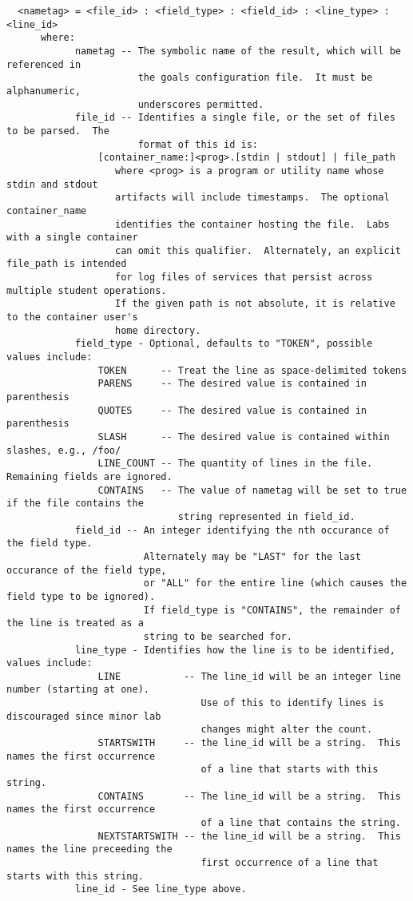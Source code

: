 \documentclass{article}
\begin{document}
\begin{verbatim}
  <nametag> = <file_id> : <field_type> : <field_id> : <line_type> : <line_id>
      where:
            nametag -- The symbolic name of the result, which will be referenced in 
                       the goals configuration file.  It must be alphanumeric, 
                       underscores permitted.
            file_id -- Identifies a single file, or the set of files to be parsed.  The 
                       format of this id is:
                [container_name:]<prog>.[stdin | stdout] | file_path
                   where <prog> is a program or utility name whose stdin and stdout 
                   artifacts will include timestamps.  The optional container_name 
                   identifies the container hosting the file.  Labs with a single container 
                   can omit this qualifier.  Alternately, an explicit file_path is intended 
                   for log files of services that persist across multiple student operations. 
                   If the given path is not absolute, it is relative to the container user's 
                   home directory. 
            field_type - Optional, defaults to "TOKEN", possible values include:
                TOKEN      -- Treat the line as space-delimited tokens
                PARENS     -- The desired value is contained in parenthesis
                QUOTES     -- The desired value is contained in parenthesis
                SLASH      -- The desired value is contained within slashes, e.g., /foo/
                LINE_COUNT -- The quantity of lines in the file. Remaining fields are ignored.
                CONTAINS   -- The value of nametag will be set to true if the file contains the
                              string represented in field_id.
            field_id -- An integer identifying the nth occurance of the field type.
                        Alternately may be "LAST" for the last occurance of the field type,
                        or "ALL" for the entire line (which causes the field type to be ignored).
                        If field_type is "CONTAINS", the remainder of the line is treated as a 
                        string to be searched for.
            line_type - Identifies how the line is to be identified, values include:
                LINE           -- The line_id will be an integer line number (starting at one). 
                                  Use of this to identify lines is discouraged since minor lab 
                                  changes might alter the count.
                STARTSWITH     -- the line_id will be a string.  This names the first occurrence 
                                  of a line that starts with this string. 
                CONTAINS       -- The line_id will be a string.  This names the first occurrence 
                                  of a line that contains the string.
                NEXTSTARTSWITH -- the line_id will be a string.  This names the line preceeding the 
                                  first occurrence of a line that starts with this string. 
            line_id - See line_type above.
\end{verbatim}
\end{document}
